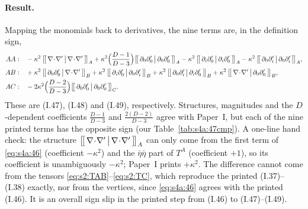 \documentclass[aps,prd,onecolumn,10pt,nofootinbib,floatfix]{revtex4-2}
\newcommand{\PI}{Paper~I}
\newcommand{\eqI}[1]{(I.#1)}
\begin{document}
\paragraph*{Result.}
Mapping the monomials back to derivatives, the nine terms are, in the definition sign,
\begin{subequations}
\label{eq:s4a:47-49}
\begin{align}
AA:\quad&-\kappa^2\,\sIVaBr{\nabla\!\cdot\!\nabla'}{\nabla\!\cdot\!\nabla'}{A}
+\kappa^2\Big(\frac{D-1}{D-3}\Big)\sIVaBr{\partial_0\partial'_0}{\partial_0\partial'_0}{A}
-\kappa^2\,\sIVaBr{\partial_i\partial'_0}{\partial_i\partial'_0}{A}
-\kappa^2\,\sIVaBr{\partial_0\partial'_i}{\partial_0\partial'_i}{A},
\label{eq:s4a:47}\\
AB:\quad&+\kappa^2\,\sIVaBr{\partial_0\partial'_0}{\nabla\!\cdot\!\nabla'}{B}
+\kappa^2\,\sIVaBr{\partial_i\partial'_0}{\partial_0\partial'_i}{B}
+\kappa^2\,\sIVaBr{\partial_0\partial'_i}{\partial_i\partial'_0}{B}
+\kappa^2\,\sIVaBr{\nabla\!\cdot\!\nabla'}{\partial_0\partial'_0}{B},
\label{eq:s4a:48}\\
AC:\quad&-2\kappa^2\Big(\frac{D-2}{D-3}\Big)\sIVaBr{\partial_0\partial'_0}{\partial_0\partial'_0}{C}.
\label{eq:s4a:49}
\end{align}
\end{subequations}
These are \eqI{47}, \eqI{48} and \eqI{49}, respectively. Structures, magnitudes and the $D$-dependent
coefficients $\frac{D-1}{D-3}$ and $\frac{2(D-2)}{D-3}$ agree with \PI{}, but each of the nine printed
terms has the opposite sign (our Table~\ref{tab:s4a:47cmp}). A one-line hand check: the structure
$\big[\!\big[\,\nabla\!\cdot\!\nabla'\,\big|\,\nabla\!\cdot\!\nabla'\,\big]\!\big]_{A}$ can only come from the first term of
\eqref{eq:s4a:46} (coefficient $-\kappa^2$) and the $\bar\eta\bar\eta$ part of $T^A$ (coefficient $+1$),
so its coefficient is unambiguously $-\kappa^2$; \PI{} prints $+\kappa^2$.
The difference cannot come from the tensors \eqref{eq:s2:TAB}--\eqref{eq:s2:TC}, which reproduce the printed \eqI{37}--\eqI{38}
exactly, nor from the vertices, since \eqref{eq:s4a:46} agrees with the printed \eqI{46}. It is an
overall sign slip in the printed step from \eqI{46} to \eqI{47}--\eqI{49}.
\end{document}
